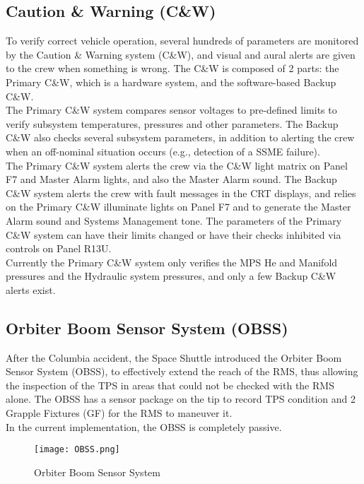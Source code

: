 \documentclass[Space_Shuttle_Vessel_Manual.tex]{subfiles}
\begin{document}
\begin{multicols*}{2}
\subsection{Caution \& Warning (C\&W)}
To verify correct vehicle operation, several hundreds of parameters are monitored by the Caution \& Warning system (C\&W), and visual and aural alerts are given to the crew when something is wrong. The C\&W is composed of 2 parts: the Primary C\&W, which is a hardware system, and the software-based Backup C\&W.\\
The Primary C\&W system compares sensor voltages to pre-defined limits to verify subsystem temperatures, pressures and other parameters. The Backup C\&W also checks several subsystem parameters, in addition to alerting the crew when an off-nominal situation occurs (e.g., detection of a SSME failure).\\
The Primary C\&W system alerts the crew via the C\&W light matrix on Panel F7 and Master Alarm lights, and also the Master Alarm sound. The Backup C\&W system alerts the crew with fault messages in the CRT displays, and relies on the Primary C\&W illuminate lights on Panel F7 and to generate the Master Alarm sound and Systems Management tone. The parameters of the Primary C\&W system can have their limits changed or have their checks inhibited via controls on Panel R13U.\\
Currently the Primary C\&W system only verifies the MPS He and Manifold pressures and the Hydraulic system pressures, and only a few Backup C\&W alerts exist.
\end{multicols*}



\begin{multicols*}{2}
\subsection{Orbiter Boom Sensor System (OBSS)}
After the Columbia accident, the Space Shuttle introduced the Orbiter Boom Sensor System (OBSS), to effectively extend the reach of the RMS, thus allowing the inspection of the TPS in areas that could not be checked with the RMS alone.
The OBSS has a sensor package on the tip to record TPS condition and 2 Grapple Fixtures (GF) for the RMS to maneuver it.\\
In the current implementation, the OBSS is completely passive.
\begin{figure}[H]
  \texttt{[image: OBSS.png]}
  \caption{Orbiter Boom Sensor System}
  \label{fig:OBSS}
\end{figure}
\end{multicols*}
\end{document}
